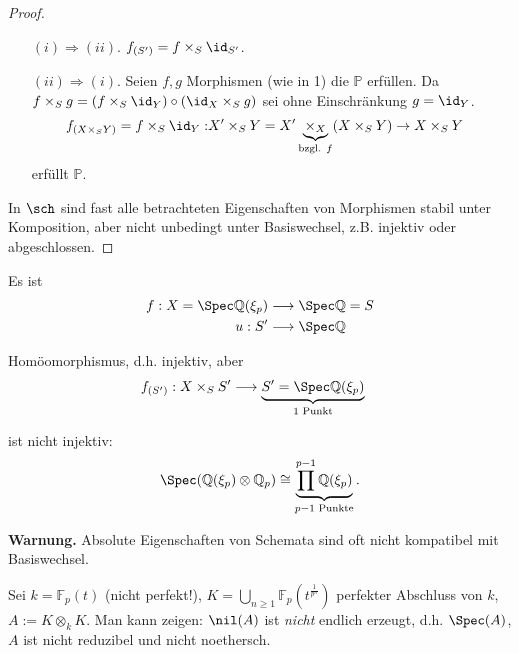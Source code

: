 \begin{proof}
  \mbox{}
  \begin{itemize}
  \item[$(i)\Rightarrow(ii)$.] $f_{(S')}=f\times_{S}\id_{S'}$.
  \item[$(ii)\Rightarrow(i)$.] Seien $f,g$ Morphismen (wie in 1) die $\mathbb{P}$ erfüllen. Da
    $f\times_{S}g=(f\times_{S}\id_{Y})\circ(\id_{X}\times_{S}g)$ sei
    ohne Einschränkung $g=\id_{Y}$.
    \begin{align*}
      f_{(X\times_{S}Y)}=f\times_{S}\id_{Y}: & X'\times_{S}Y=X'\underbrace{\times_{X}}_{\text{bzgl. }f}(X\times_{S}Y)\rightarrow X\times_{S}Y
    \end{align*}
    erfüllt $\mathbb{P}$.
  \end{itemize}
  In $\sch$ sind fast alle betrachteten Eigenschaften von Morphismen
  stabil unter Komposition, aber nicht unbedingt unter Basiswechsel,
  z.B. injektiv oder abgeschlossen.
\end{proof}
\begin{example*}
  Es ist
  \begin{align*}
    f:X=\Spec\mathbb{Q}(\xi_{p}) & \longrightarrow\Spec\mathbb{Q}=S\\
    u:S' & \longrightarrow\Spec\mathbb{Q}
  \end{align*}

  Homöomorphismus, d.h. injektiv, aber
  \begin{align*}
    f_{(S')}:X\times_{S}S' & \longrightarrow\underbrace{S'=\Spec\mathbb{Q}(\xi_{p})}_{1\text{ Punkt}}
  \end{align*}

  ist nicht injektiv:
  \[
    \Spec(\mathbb{Q}(\xi_{p})\otimes\mathbb{Q}_{p})\cong\underbrace{\prod^{p-1}\mathbb{Q}(\xi_{p})}_{p-1\text{ Punkte}}.
  \]
\end{example*}
\textbf{Warnung.} Absolute Eigenschaften von Schemata sind oft nicht
kompatibel mit Basiswechsel.

Sei $k=\mathbb{F}_{p}(t)$ (nicht perfekt!), $K=\bigcup_{n\geq1}\mathbb{F}_{p}(t^{\frac{1}{p^{n}}})$
perfekter Abschluss von $k$, $A:=K\otimes_{k}K$. Man kann zeigen:
$\nil(A)$ ist \emph{nicht} endlich erzeugt, d.h. $\Spec(A)$, $A$
ist nicht reduzibel und nicht noethersch.